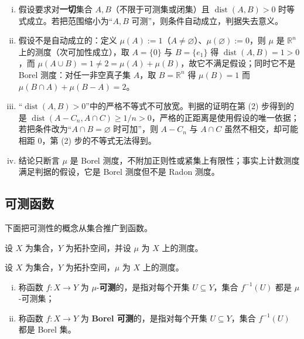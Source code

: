\documentclass[../../main.tex]{subfiles}
\begin{document}
\begin{remark}\label{remark:ch01-thm-1-9-条件}
\begin{enumerate}[(i)]
\item 假设要求对\textbf{一切}集合 $A,B$（不限于可测集或闭集）且 $\operatorname{dist}(A,B)>0$ 时等式成立。若把范围缩小为“$A,B$ 可测”，则条件自动成立，判据失去意义。
\item 假设不是自动成立的：定义 $\mu(A):=1$（$A\neq\varnothing$）、$\mu(\varnothing):=0$，则 $\mu$ 是 $\mathbb{R}^{n}$ 上的测度（次可加性成立），取 $A=\{0\}$ 与 $B=\{e_{1}\}$ 得 $\operatorname{dist}(A,B)=1>0$，而 $\mu(A\cup B)=1\neq2=\mu(A)+\mu(B)$，故它不满足假设；同时它不是 Borel 测度：对任一非空真子集 $A$，取 $B=\mathbb{R}^{n}$ 得 $\mu(B)=1$ 而 $\mu(B\cap A)+\mu(B-A)=2$。
\item “$\operatorname{dist}(A,B)>0$”中的严格不等式不可放宽。判据的证明在第 (2) 步得到的是 $\operatorname{dist}(A-C_{n},A\cap C)\geqslant1/n>0$，严格的正距离是使用假设的唯一依据；若把条件改为“$A\cap B=\varnothing$ 时可加”，则 $A-C_{n}$ 与 $A\cap C$ 虽然不相交，却可能相距 $0$，第 (2) 步的不等式无法得到。
\item 结论只断言 $\mu$ 是 Borel 测度，不附加正则性或紧集上有限性；事实上计数测度满足判据的假设，它是 Borel 测度但不是 Radon 测度。
\end{enumerate}
\end{remark}

\subsection{可测函数}\label{subsection:ch01-01-可测}

下面把可测性的概念从集合推广到函数。

设 $X$ 为集合，$Y$ 为拓扑空间，并设 $\mu$ 为 $X$ 上的测度。

\begin{definition}\label{definition:ch01-1-10}
设 $X$ 为集合，$Y$ 为拓扑空间，$\mu$ 为 $X$ 上的测度。
\begin{enumerate}[(i)]
\item 称函数 $f:X\to Y$ 为 $\mu$-\textbf{可测}的，是指对每个开集 $U\subseteq Y$，集合 $f^{-1}(U)$ 都是 $\mu$-可测集；
\item 称函数 $f:X\to Y$ 为 \textbf{Borel 可测}的，是指对每个开集 $U\subseteq Y$，集合 $f^{-1}(U)$ 都是 Borel 集。
\end{enumerate}
\end{definition}
\end{document}
